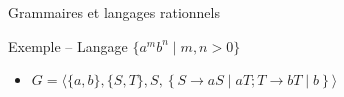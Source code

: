 \begin{frame}{Grammaires et langages rationnels}
  \vspace{-1mm}
  \begin{exampleblock}{Exemple -- Langage $\{a^m b^n \mid m, n > 0\}$}
  \vspace{-1mm}
    \begin{itemize}
    \item $G = \langle \{a, b\}, \{S, T\}, S, \left\{S \rightarrow a S \mid a T ; T \rightarrow b T \mid b \right\} \rangle $
    \end{itemize}
  \end{exampleblock}

\end{frame}

\endgroup
\endinput
